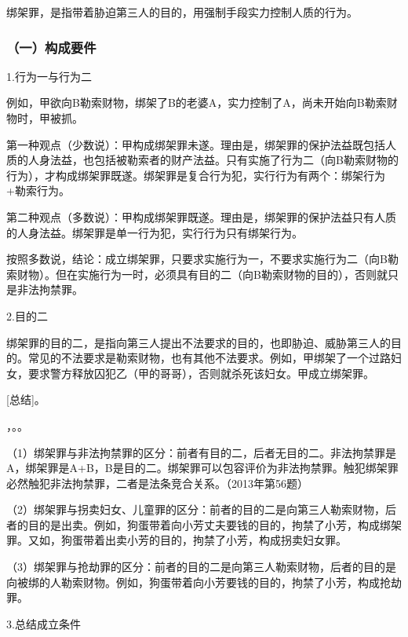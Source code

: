 绑架罪，是指带着胁迫第三人的目的，用强制手段实力控制人质的行为。


\subsubsection*{（一）构成要件}

1.行为一与行为二

例如，甲欲向B勒索财物，绑架了B的老婆A，实力控制了A，尚未开始向B勒索财物时，甲被抓。

第一种观点（少数说）：甲构成绑架罪未遂。理由是，绑架罪的保护法益既包括人质的人身法益，也包括被勒索者的财产法益。只有实施了行为二（向B勒索财物的行为），才构成绑架罪既遂。绑架罪是复合行为犯，实行行为有两个：绑架行为+勒索行为。

第二种观点（多数说）：甲构成绑架罪既遂。理由是，绑架罪的保护法益只有人质的人身法益。绑架罪是单一行为犯，实行行为只有绑架行为。

按照多数说，结论：成立绑架罪，只要求实施行为一，不要求实施行为二（向B勒索财物）。但在实施行为一时，必须具有目的二（向B勒索财物的目的），否则就只是非法拘禁罪。

2.目的二

绑架罪的目的二，是指向第三人提出不法要求的目的，也即胁迫、威胁第三人的目的。常见的不法要求是勒索财物，也有其他不法要求。例如，甲绑架了一个过路妇女，要求警方释放囚犯乙（甲的哥哥），否则就杀死该妇女。甲成立绑架罪。

[总结]。

，。。

（1）绑架罪与非法拘禁罪的区分：前者有目的二，后者无目的二。非法拘禁罪是A，绑架罪是A+B，B是目的二。绑架罪可以包容评价为非法拘禁罪。触犯绑架罪必然触犯非法拘禁罪，二者是法条竞合关系。（2013年第56题）

（2）绑架罪与拐卖妇女、儿童罪的区分：前者的目的二是向第三人勒索财物，后者的目的是出卖。例如，狗蛋带着向小芳丈夫要钱的目的，拘禁了小芳，构成绑架罪。又如，狗蛋带着出卖小芳的目的，拘禁了小芳，构成拐卖妇女罪。

（3）绑架罪与抢劫罪的区分：前者的目的二是向第三人勒索财物，后者的目的是向被绑的人勒索财物。例如，狗蛋带着向小芳要钱的目的，拘禁了小芳，构成抢劫罪。

3.总结成立条件

